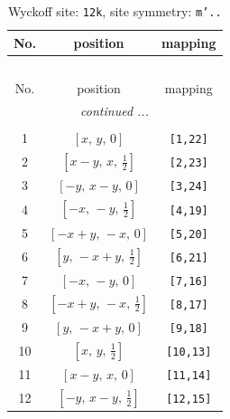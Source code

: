 \documentclass[fleqn,8pt]{jsarticle}
\begin{document}
\begin{longtable}{ccc}
\caption{Wyckoff site: {\tt 12k}, site symmetry: {\tt m'..}}
 \\
 \hline \hline
No. & position & mapping \\ \hline \endfirsthead

\multicolumn{2}{l}{\tablename\ \thetable{}} \\
 \hline \hline
No. & position & mapping \\ \hline \endhead

 \hline \hline
\multicolumn{2}{r}{\footnotesize\it continued ...} \\ \endfoot

 \hline \hline
\multicolumn{2}{r}{} \\ \endlastfoot

1 & $\left[ x,\, y,\, 0 \right]$ & {\tt [1,22]} \\ \hline
2 & $\left[ x - y,\, x,\, \frac{1}{2} \right]$ & {\tt [2,23]} \\ \hline
3 & $\left[ - y,\, x - y,\, 0 \right]$ & {\tt [3,24]} \\ \hline
4 & $\left[ - x,\, - y,\, \frac{1}{2} \right]$ & {\tt [4,19]} \\ \hline
5 & $\left[ - x + y,\, - x,\, 0 \right]$ & {\tt [5,20]} \\ \hline
6 & $\left[ y,\, - x + y,\, \frac{1}{2} \right]$ & {\tt [6,21]} \\ \hline
7 & $\left[ - x,\, - y,\, 0 \right]$ & {\tt [7,16]} \\ \hline
8 & $\left[ - x + y,\, - x,\, \frac{1}{2} \right]$ & {\tt [8,17]} \\ \hline
9 & $\left[ y,\, - x + y,\, 0 \right]$ & {\tt [9,18]} \\ \hline
10 & $\left[ x,\, y,\, \frac{1}{2} \right]$ & {\tt [10,13]} \\ \hline
11 & $\left[ x - y,\, x,\, 0 \right]$ & {\tt [11,14]} \\ \hline
12 & $\left[ - y,\, x - y,\, \frac{1}{2} \right]$ & {\tt [12,15]} \\
\end{longtable}
\renewcommand{\arraystretch}{1.2}
\end{document}
